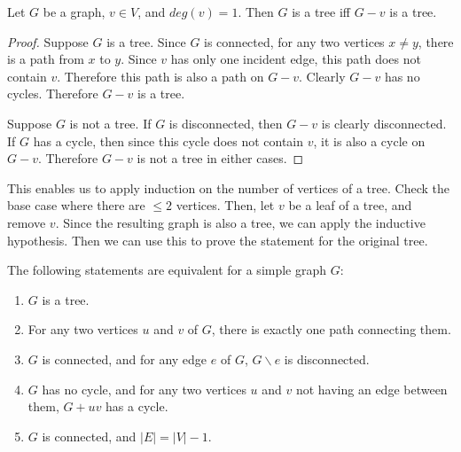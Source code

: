         \begin{lemma} \label{lem_tree_grow}
            Let $G$ be a graph, $v \in V$, and $deg(v) = 1$. Then $G$ is a tree iff $G-v$ is a tree.
        \end{lemma}
        \begin{proof}
            Suppose $G$ is a tree. Since $G$ is connected, for any two vertices $x \neq y$, there is a path from $x$ to $y$. Since $v$ has only one incident edge, this path does not contain $v$. Therefore this path is also a path on $G-v$. Clearly $G-v$ has no cycles. Therefore $G-v$ is a tree.
            
            Suppose $G$ is not a tree. If $G$ is disconnected, then $G-v$ is clearly disconnected. If $G$ has a cycle, then since this cycle does not contain $v$, it is also a cycle on $G-v$. Therefore $G-v$ is not a tree in either cases.
        \end{proof}
        
        This enables us to apply induction on the number of vertices of a tree. Check the base case where there are $\leq 2$ vertices. Then, let $v$ be a leaf of a tree, and remove $v$. Since the resulting graph is also a tree, we can apply the inductive hypothesis. Then we can use this to prove the statement for the original tree.
        
        \begin{thm} \label{thm_tree}
            The following statements are equivalent for a simple graph $G$: \begin{enumerate}
                \item $G$ is a tree.
                \item For any two vertices $u$ and $v$ of $G$, there is exactly one path connecting them.
                \item $G$ is connected, and for any edge $e$ of $G$, $G \backslash e$ is disconnected.
                \item $G$ has no cycle, and for any two vertices $u$ and $v$ not having an edge between them, $G+uv$ has a cycle.
                \item $G$ is connected, and $|E| = |V|-1$.
            \end{enumerate}
        \end{thm}

